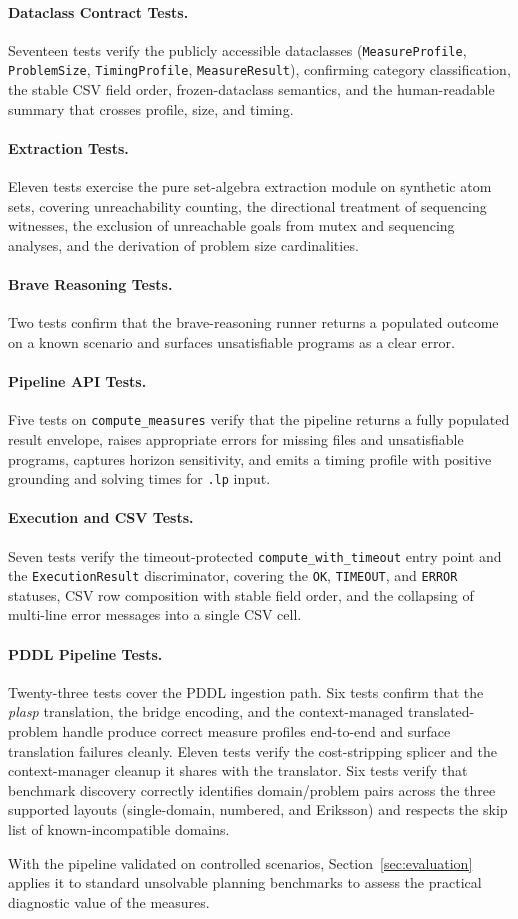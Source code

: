 \paragraph{Dataclass Contract Tests.}
Seventeen tests verify the publicly accessible dataclasses (\texttt{MeasureProfile}, \texttt{ProblemSize}, \texttt{TimingProfile}, \texttt{MeasureResult}), confirming category classification, the stable CSV field order, frozen-dataclass semantics, and the human-readable summary that crosses profile, size, and timing.

\paragraph{Extraction Tests.}
Eleven tests exercise the pure set-algebra extraction module on synthetic atom sets, covering unreachability counting, the directional treatment of sequencing witnesses, the exclusion of unreachable goals from mutex and sequencing analyses, and the derivation of problem size cardinalities.

\paragraph{Brave Reasoning Tests.}
Two tests confirm that the brave-reasoning runner returns a populated outcome on a known scenario and surfaces unsatisfiable programs as a clear error.

\paragraph{Pipeline \ac{API} Tests.}
Five tests on \texttt{compute\_measures} verify that the pipeline returns a fully populated result envelope, raises appropriate errors for missing files and unsatisfiable programs, captures horizon sensitivity, and emits a timing profile with positive grounding and solving times for \texttt{.lp} input.

\paragraph{Execution and CSV Tests.}
Seven tests verify the timeout-protected \texttt{compute\_with\_timeout} entry point and the \texttt{ExecutionResult} discriminator, covering the \texttt{OK}, \texttt{TIMEOUT}, and \texttt{ERROR} statuses, CSV row composition with stable field order, and the collapsing of multi-line error messages into a single CSV cell.

\paragraph{PDDL Pipeline Tests.}
Twenty-three tests cover the \ac{PDDL} ingestion path. Six tests confirm that the \textit{plasp} translation, the bridge encoding, and the context-managed translated-problem handle produce correct measure profiles end-to-end and surface translation failures cleanly. Eleven tests verify the cost-stripping splicer and the context-manager cleanup it shares with the translator. Six tests verify that benchmark discovery correctly identifies domain/problem pairs across the three supported layouts (single-domain, numbered, and Eriksson) and respects the skip list of known-incompatible domains.

With the pipeline validated on controlled scenarios, Section~\ref{sec:evaluation} applies it to standard unsolvable planning benchmarks to assess the practical diagnostic value of the measures.
